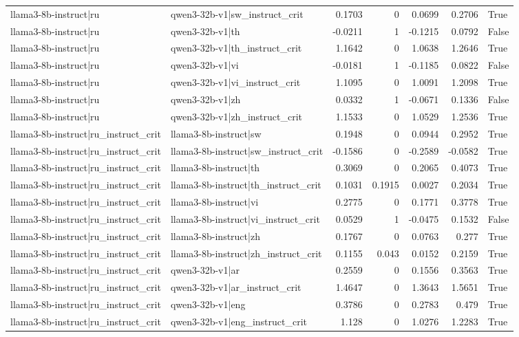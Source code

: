 \begin{table}
\begin{tabular}{l l r r r r l}
llama3-8b-instruct|ru & qwen3-32b-v1|sw_instruct_crit & 0.1703 & 0 & 0.0699 & 0.2706 & True \\
llama3-8b-instruct|ru & qwen3-32b-v1|th & -0.0211 & 1 & -0.1215 & 0.0792 & False \\
llama3-8b-instruct|ru & qwen3-32b-v1|th_instruct_crit & 1.1642 & 0 & 1.0638 & 1.2646 & True \\
llama3-8b-instruct|ru & qwen3-32b-v1|vi & -0.0181 & 1 & -0.1185 & 0.0822 & False \\
llama3-8b-instruct|ru & qwen3-32b-v1|vi_instruct_crit & 1.1095 & 0 & 1.0091 & 1.2098 & True \\
llama3-8b-instruct|ru & qwen3-32b-v1|zh & 0.0332 & 1 & -0.0671 & 0.1336 & False \\
llama3-8b-instruct|ru & qwen3-32b-v1|zh_instruct_crit & 1.1533 & 0 & 1.0529 & 1.2536 & True \\
llama3-8b-instruct|ru_instruct_crit & llama3-8b-instruct|sw & 0.1948 & 0 & 0.0944 & 0.2952 & True \\
llama3-8b-instruct|ru_instruct_crit & llama3-8b-instruct|sw_instruct_crit & -0.1586 & 0 & -0.2589 & -0.0582 & True \\
llama3-8b-instruct|ru_instruct_crit & llama3-8b-instruct|th & 0.3069 & 0 & 0.2065 & 0.4073 & True \\
llama3-8b-instruct|ru_instruct_crit & llama3-8b-instruct|th_instruct_crit & 0.1031 & 0.1915 & 0.0027 & 0.2034 & True \\
llama3-8b-instruct|ru_instruct_crit & llama3-8b-instruct|vi & 0.2775 & 0 & 0.1771 & 0.3778 & True \\
llama3-8b-instruct|ru_instruct_crit & llama3-8b-instruct|vi_instruct_crit & 0.0529 & 1 & -0.0475 & 0.1532 & False \\
llama3-8b-instruct|ru_instruct_crit & llama3-8b-instruct|zh & 0.1767 & 0 & 0.0763 & 0.277 & True \\
llama3-8b-instruct|ru_instruct_crit & llama3-8b-instruct|zh_instruct_crit & 0.1155 & 0.043 & 0.0152 & 0.2159 & True \\
llama3-8b-instruct|ru_instruct_crit & qwen3-32b-v1|ar & 0.2559 & 0 & 0.1556 & 0.3563 & True \\
llama3-8b-instruct|ru_instruct_crit & qwen3-32b-v1|ar_instruct_crit & 1.4647 & 0 & 1.3643 & 1.5651 & True \\
llama3-8b-instruct|ru_instruct_crit & qwen3-32b-v1|eng & 0.3786 & 0 & 0.2783 & 0.479 & True \\
llama3-8b-instruct|ru_instruct_crit & qwen3-32b-v1|eng_instruct_crit & 1.128 & 0 & 1.0276 & 1.2283 & True \\

\end{tabular}
\end{table}
